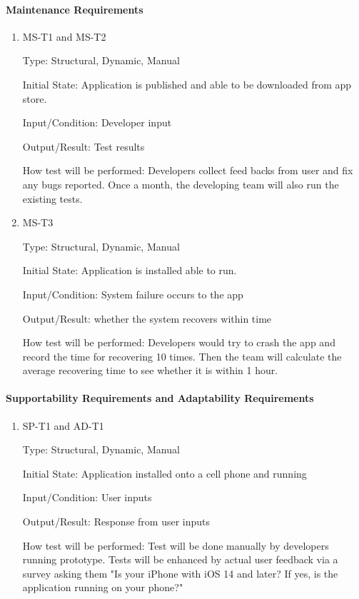 \documentclass[12pt, titlepage]{article}
\begin{document}
\paragraph{Maintenance Requirements}
\begin{enumerate}

\item{MS-T1 and MS-T2\\}

Type: Structural, Dynamic, Manual
					
Initial State: Application is published and able to be downloaded from app store.
					
Input/Condition: Developer input
					
Output/Result: Test results
					
How test will be performed: Developers collect feed backs from user and fix any bugs reported. Once a month, the developing team will also run the existing tests.
\item{MS-T3\\}

Type: Structural, Dynamic, Manual
					
Initial State: Application is installed able to run.
					
Input/Condition: System failure occurs to the app
					
Output/Result: whether the system recovers within time
					
How test will be performed: Developers would try to crash the app and record the time for recovering 10 times. Then the team will calculate the average recovering time to see whether it is within 1 hour.
\end{enumerate}
\paragraph{Supportability Requirements and Adaptability Requirements}

\begin{enumerate}

\item{SP-T1 and AD-T1\\}

Type: Structural, Dynamic, Manual
					
Initial State: Application installed onto a cell phone and running
					
Input/Condition: User inputs
					
Output/Result: Response from user inputs
					
How test will be performed: Test will be done manually by developers running prototype. Tests will be enhanced by actual user feedback via a survey asking them "Is your iPhone with iOS 14 and later? If yes, is the application running on your phone?"

\end{enumerate}
\end{document}
